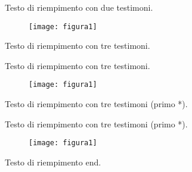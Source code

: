 \documentclass[a4paper]{article}
\begin{document}
\pstart\Unit Testo di riempimento con due testimoni. \pend
\pausenumbering
\begin{figure}[h]
\centering

\texttt{[image: figura1]}\par
{}

\end{figure}
\resumenumbering
 \pstart\Unit Testo di
riempimento con tre testimoni. \pend
\pausenumbering
\begin{figure}[h]
\centering
{}
\par
{}

\end{figure}
\resumenumbering
 \pstart\Unit Testo di riempimento con tre
testimoni. \pend
\pausenumbering
\begin{figure}[h]
\centering

\texttt{[image: figura1]}\par
{}

\end{figure}
\resumenumbering
 \pstart\Unit Testo di riempimento con tre testimoni (primo *).
\pend
\pausenumbering
\begin{figure}[h]
\centering
{}
\par
{}

\end{figure}
\resumenumbering
 \pstart\Unit Testo di riempimento con tre testimoni (primo *). \pend
\pausenumbering
\begin{figure}[h]
\centering

\texttt{[image: figura1]}\par
{}

\end{figure}
\resumenumbering

\pstart\Unit Testo di riempimento end. \pend\clearpage

\endnumbering
\end{document}
